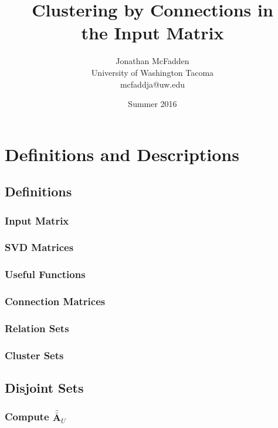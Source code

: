 \documentclass{book}[12pt]
\title{Clustering by Connections in \\
the Input Matrix}
\date{Summer 2016}
\author{Jonathan McFadden \\ University of Washington Tacoma \\ mcfaddja@uw.edu}
\numberwithin{equation}{section}
\newcommand{\mat}[1]{\bar{\bar{\mathbf{#1}}}}
\begin{document}
\maketitle

\tableofcontents


\part{Definitions and Descriptions}


\chapter{Definitions}

\section{Input Matrix}


\section{SVD Matrices}


\section{Useful Functions}


\section{Connection Matrices}


\section{Relation Sets}


\section{Cluster Sets}



\chapter{Disjoint Sets}


\section{Compute $\mat{A}_U$}

\end{document}
